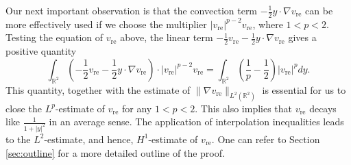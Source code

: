 \documentclass[12pt]{amsart}
\numberwithin{equation}{section}              %
\theoremstyle{remark}
\begin{document}
      Our next  important observation is that the convection term $-\frac{1}{2}y\cdot \nabla v_{\text{re}}$ can be more effectively used if we choose the multiplier $|v_{\text{re}}|^{p-2}v_{\text{re}}$, 
where $1<p<2$. 
Testing the equation of $v_{\textrm{re}}$ above, the linear  term $-\frac{1}{2}v_{\text{re}} -\frac{1}{2}y\cdot \nabla v_{\text{re}}$
gives a positive quantity
\begin{equation*}
 \int_{\mathbb{R}^2} (-\frac{1}{2}v_{\text{re}} -\frac{1}{2}y\cdot \nabla v_{\text{re}})\cdot |v_{\text{re}}|^{p-2}v_{\text{re}} =
 \int_{\mathbb{R}^2}\left(\frac{1}{p}-\frac{1}{2}\right) |v_{\text{re}}|^{p}dy. 
\end{equation*}
This quantity, together with the estimate of $\|\nabla v_{\text{re}}\|_{L^2(\mathbb{R}^2)}$ is
 essential  for us to close the $L^p$-estimate of $v_{\text{re}}$ for any $1<p<2$. This also implies that $v_{\textrm{re}}$  decays like  $\frac{1}{1+|y|^2}$  in an average sense.  The application of  interpolation inequalities  leads to the $L^2$-estimate, and hence,  $H^1$-estimate of $v_{\text{re}}$. One can refer to Section \ref{sec:outline} for a more detailed outline of the proof.
      
    
	
\end{document}
